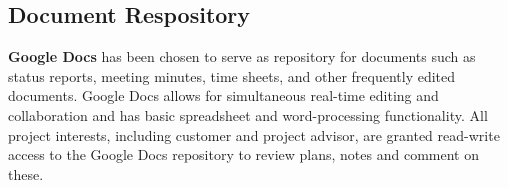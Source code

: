 \subsection{Document Respository}
\textbf{Google Docs} has been chosen to serve as repository for documents such as status reports, meeting minutes, time sheets, and other frequently edited documents. Google Docs allows for simultaneous real-time editing and collaboration and has basic spreadsheet and word-processing functionality. All project interests, including customer and project advisor, are granted read-write access to the Google Docs repository to review plans, notes and comment on these.

